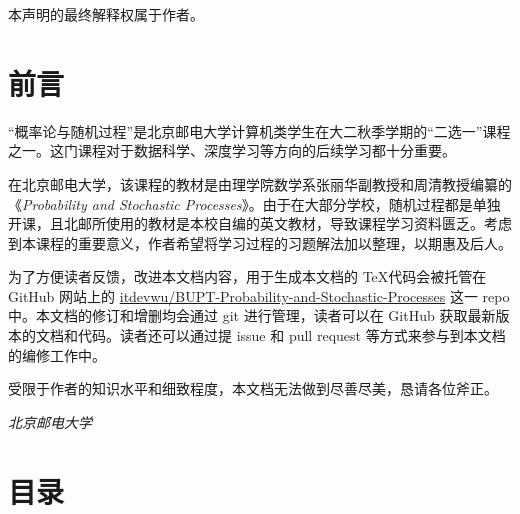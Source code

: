 本声明的最终解释权属于作者。


\newpage
\section*{前言}

“概率论与随机过程”是北京邮电大学计算机类学生在大二秋季学期的“二选一”课程之一。这门课程对于数据科学、深度学习等方向的后续学习都十分重要。

在北京邮电大学，该课程的教材是由理学院数学系张丽华副教授和周清教授编纂的《\textit{Probability and Stochastic Processes}》。由于在大部分学校，随机过程都是单独开课，且北邮所使用的教材是本校自编的英文教材，导致课程学习资料匮乏。考虑到本课程的重要意义，作者希望将学习过程的习题解法加以整理，以期惠及后人。

为了方便读者反馈，改进本文档内容，用于生成本文档的 \TeX 代码会被托管在 GitHub 网站上的 \href{https://github.com/itdevwu/BUPT-Probability-and-Stochastic-Processes}{itdevwu/BUPT-Probability-and-Stochastic-Processes} 这一 repo 中。本文档的修订和增删均会通过 git 进行管理，读者可以在 GitHub 获取最新版本的文档和代码。读者还可以通过提 issue 和 pull request 等方式来参与到本文档的编修工作中。

受限于作者的知识水平和细致程度，本文档无法做到尽善尽美，恳请各位斧正。

\begin{flushright}
    \vfill \textit{
        北京邮电大学\\
        \theauthor
    }
\end{flushright}



\newpage
\section*{目录}
\vspace{-3cm}
\tableofcontents
